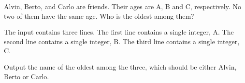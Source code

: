 Alvin, Berto, and Carlo are friends. Their ages are A, B and C, respectively. No two of them have the same age. Who is the oldest among them?

The input contains three lines. The first line contains a single integer, A. The second line contains a single integer, B. The third line contains a single integer, C.

Output the name of the oldest among the three, which should be either Alvin, Berto or Carlo.